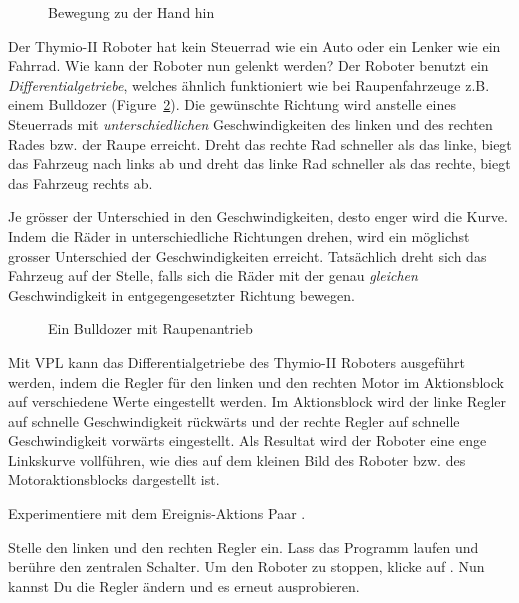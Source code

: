 \begin{figure}
\begin{center}
\caption{Bewegung zu der Hand hin}
\label{fig.follow-hand}
\end{center}
\end{figure}


Der Thymio-II Roboter hat kein Steuerrad wie ein Auto oder ein Lenker wie ein Fahrrad.
Wie kann der Roboter nun gelenkt werden? Der Roboter benutzt ein \emph{Differentialgetriebe},
welches ähnlich funktioniert wie bei Raupenfahrzeuge z.B. einem Bulldozer (Figure~\ref{fig.bull}).
Die gewünschte Richtung wird anstelle eines Steuerrads mit \emph{unterschiedlichen} Geschwindigkeiten
des linken und des rechten Rades bzw. der Raupe erreicht. Dreht das rechte Rad schneller als das linke,
biegt das Fahrzeug nach links ab und dreht das linke Rad schneller als das rechte, biegt das Fahrzeug rechts ab.

Je grösser der Unterschied in den Geschwindigkeiten,
desto enger  wird die Kurve. Indem die Räder in unterschiedliche Richtungen drehen,
wird ein möglichst grosser Unterschied der Geschwindigkeiten erreicht. 
Tatsächlich dreht sich das Fahrzeug auf der Stelle, 
falls sich die Räder mit der genau \emph{gleichen} 
Geschwindigkeit in entgegengesetzter Richtung bewegen.

\begin{figure}
\begin{center}
\caption{Ein Bulldozer mit Raupenantrieb} 
\label{fig.bull}
\end{center}
\end{figure}

Mit VPL kann das Differentialgetriebe des Thymio-II Roboters ausgeführt werden,
indem die Regler für den linken und den rechten Motor im Aktionsblock auf verschiedene Werte eingestellt werden.
Im Aktionsblock  wird der linke Regler auf schnelle Geschwindigkeit rückwärts 
und der rechte Regler auf schnelle Geschwindigkeit vorwärts eingestellt. 
Als Resultat wird der Roboter eine enge Linkskurve vollführen, 
wie dies auf dem kleinen Bild des Roboter bzw. des Motoraktionsblocks dargestellt ist.

Experimentiere mit dem Ereignis-Aktions Paar .

Stelle den linken und den rechten Regler ein.
Lass das Programm laufen und berühre den zentralen Schalter.
Um den Roboter zu stoppen, klicke auf .
Nun kannst Du die Regler ändern und es erneut ausprobieren.

